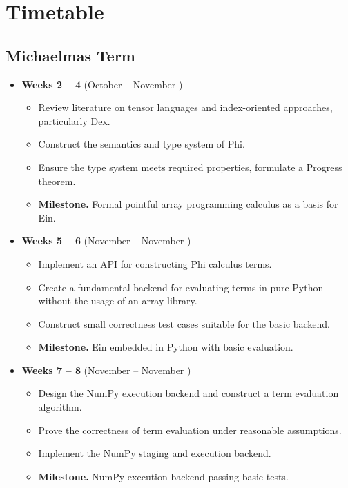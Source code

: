 \section{Timetable}

\subsection{Michaelmas Term}

\begin{itemize}
    \item \textbf{Weeks 2 -- 4} (October  -- November )  \begin{itemize}
        \item Review literature on tensor languages and index-oriented approaches, particularly Dex.
        \item Construct the semantics and type system of Phi.
        \item Ensure the type system meets required properties, formulate a Progress theorem.
        \item \textbf{Milestone.} Formal pointful array programming calculus as a basis for Ein.
    \end{itemize}
    \item \textbf{Weeks 5 -- 6} (November  -- November ) 
 \begin{itemize}
        \item Implement an API for constructing Phi calculus terms.     
        \item Create a fundamental backend for evaluating terms in pure Python without the usage of an array library.
        \item Construct small correctness test cases suitable for the basic backend.
        \item \textbf{Milestone.} Ein embedded in Python with basic evaluation.
    \end{itemize}
    \item \textbf{Weeks 7 -- 8} (November  -- November ) \begin{itemize}
        \item Design the NumPy execution backend and construct a term evaluation algorithm.
        \item Prove the correctness of term evaluation under reasonable assumptions.
        \item Implement the NumPy staging and execution backend.
        \item \textbf{Milestone.} NumPy execution backend passing basic tests.
    \end{itemize}
\end{itemize}


